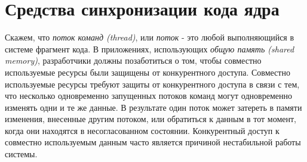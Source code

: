 \section{Средства синхронизации кода ядра}
Скажем, что \textit{поток команд (thread)}, или \textit{поток} - это любой выполняющийся в системе фрагмент кода. В приложениях, использующих \textit{общую память (shared memory)}, разработчики должны позаботиться о том, чтобы совместно используемые ресурсы были защищены от конкурентного доступа. Совместно используемые ресурсы требуют защиты от конкурентного доступа в связи с тем, что несколько одновременно запущенных потоков команд могут одновременно изменять одни и те же данные. В результате один поток может затереть в памяти изменения, внесенные другим потоком, или обратиться к данным в тот момент, когда они находятся в несогласованном состоянии. Конкурентный доступ к совместно используемым данным часто является причиной нестабильной работы системы. 

